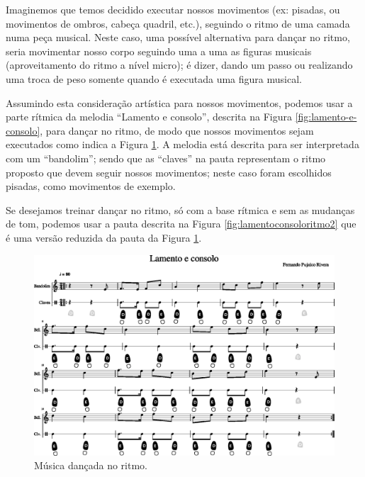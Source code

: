 \begin{example}
\label{ex:dancaritmo1}
Imaginemos que temos decidido executar nossos movimentos (ex: pisadas, ou movimentos de ombros, cabeça quadril, etc.),
seguindo o ritmo de uma camada numa peça musical.
Neste caso, uma possível alternativa para dançar no ritmo, 
seria movimentar nosso corpo seguindo uma a uma as figuras musicais (aproveitamento do ritmo a nível micro);
é dizer, dando um passo ou realizando uma troca de peso somente quando é executada uma figura musical.

Assumindo esta  consideração artística para nossos movimentos, 
podemos usar a parte rítmica da melodia ``Lamento e consolo'', descrita na Figura \ref{fig:lamento-e-consolo},
para dançar no ritmo, 
de modo que nossos movimentos sejam executados como indica a Figura \ref{fig:lamentoconsoloritmo1}.
A melodia está descrita para ser interpretada com um ``bandolim'';
sendo que as ``claves'' na pauta representam o ritmo proposto que devem seguir nossos movimentos;
neste caso foram escolhidos pisadas, como movimentos de exemplo.

Se desejamos treinar dançar no ritmo, só com a base rítmica e sem as mudanças de tom,  
podemos usar a pauta descrita na Figura \ref{fig:lamentoconsoloritmo2} que é uma versão 
reduzida da pauta da Figura \ref{fig:lamentoconsoloritmo1}.

\end{example}
\begin{figure}
    \centering
    \includegraphics[width=\textwidth]{chapters/cap-musicalidade-tecnica/lamento-e-consolo-clave-ritmo-1.eps}
    \caption{Música dançada no ritmo.}
    \label{fig:lamentoconsoloritmo1}
\end{figure}


